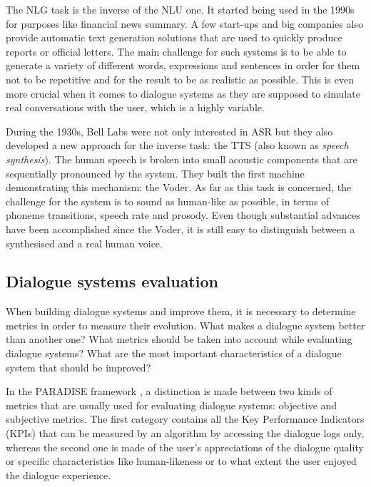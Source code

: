 		The NLG task is the inverse of the NLU one. It started being used in the 1990s for purposes like financial news summary. A few start-ups and big companies also provide automatic text generation solutions that are used to quickly produce reports or official letters. The main challenge for such systems is to be able to generate a variety of different words, expressions and sentences in order for them not to be repetitive and for the result to be as realistic as possible. This is even more crucial when it comes to dialogue systems as they are supposed to simulate real conversations with the user, which is a highly variable.

		During the 1930s, Bell Labs were not only interested in ASR but they also developed a new approach for the inverse task: the TTS (also known as \textit{speech synthesis}). The human speech is broken into small acoustic components that are sequentially pronounced by the system. They built the first machine demonstrating this mechanism: the Voder. As far as this task is concerned, the challenge for the system is to sound as human-like as possible, in terms of phoneme transitions, speech rate and prosody. Even though substantial advances have been accomplished since the Voder, it is still easy to distinguish between a synthesised and a real human voice.

	\subsection{Dialogue systems evaluation}

		When building dialogue systems and improve them, it is necessary to determine metrics in order to measure their evolution. What makes a dialogue system better than another one? What metrics should be taken into account while evaluating dialogue systems? What are the most important characteristics of a dialogue system that should be improved?

		In the PARADISE framework \cite{Walker1997}, a distinction is made between two kinds of metrics that are usually used for evaluating dialogue systems: objective and subjective metrics. The first category contains all the Key Performance Indicators (KPIs) that can be measured by an algorithm by accessing the dialogue logs only, whereas the second one is made of the user's appreciations of the dialogue quality or specific characteristics like human-likeness or to what extent the user enjoyed the dialogue experience.

